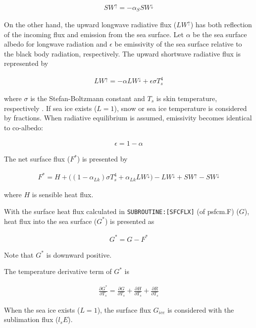 \begin{eqnarray}
    SW^\uparrow = - \alpha_S SW^\downarrow
\end{eqnarray}

On the other hand, the upward longwave radiative flux (\(LW^\uparrow\)) has both reflection of the incoming flux and emission from the sea surface. Let \(\alpha\) be the sea surface albedo for
longwave radiation and \(\epsilon\) be emissivity of the sea surface relative to the black body radiation, respectively. The upward shortwave radiative flux is represented by

\begin{eqnarray}
    LW^\uparrow = - \alpha LW^\downarrow + \epsilon \sigma T_s ^4
\end{eqnarray}

where \(\sigma\) is the Stefan-Boltzmann constant and \(T_s\) is skin temperature, respectively . If sea ice exists (\(L=1\)), snow or sea ice temperature is considered by fractions. When radiative
equilibrium is assumed, emissivity becomes identical to co-albedo:

\begin{eqnarray}
    \epsilon = 1 - \alpha
\end{eqnarray}

The net surface flux (\(F^*\)) is presented by

\begin{eqnarray}
    F^*=H + \Big((1-\alpha_{Lk})\sigma T_s^4 + \alpha_{Lk} LW^\downarrow\Big)  - LW^\downarrow +SW^\uparrow - SW^\downarrow
\end{eqnarray}

where \(H\) is sensible heat flux.

With the surface heat flux calculated in \texttt{SUBROUTINE:{[}SFCFLX{]}} (of psfcm.F) (\(G\)), heat flux into the sea surface (\(G^*\)) is presented as

\begin{eqnarray}
    G^* = G - F^*
\end{eqnarray}

Note that \(G^*\) is downward positive.

The temperature derivative term of \(G^*\) is

\begin{eqnarray}
    \frac{\partial G^*}{\partial T_s} = \frac{\partial G}{\partial T_s}+\frac{\partial H}{\partial T_s}+\frac{\partial R}{\partial T_s}
\end{eqnarray}

When the sea ice exists (\(L=1\)), the surface flux \(G_{ice}\) is considered with the sublimation flux (\(l_s E\)).


